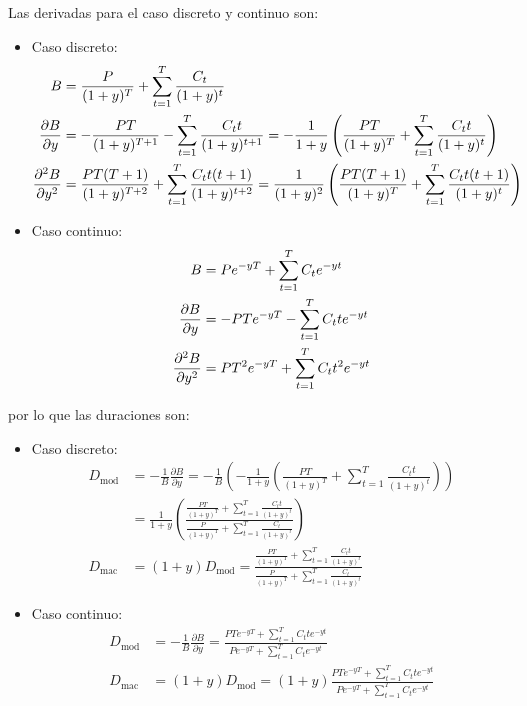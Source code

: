 Las derivadas para el caso discreto y continuo son:
\begin{itemize}
    \item Caso discreto:
    \begin{align}\label{eq:derivadas_bono_discreto}
        B &= \frac{P}{(1+y)^T} + \sum_{t=1}^{T} \frac{C_t}{(1+y)^t} \notag \\
        \frac{\partial B}{\partial y} &= -\frac{P T}{(1+y)^{T+1}} - \sum_{t=1}^{T} \frac{C_t t}{(1+y)^{t+1}} = - \frac{1}{1+y}\left( \frac{P T}{(1+y)^{T}} + \sum_{t=1}^{T} \frac{C_t t}{(1+y)^{t}} \right) \\
        \frac{\partial^2 B}{\partial y^2} &= \frac{P T (T+1)}{(1+y)^{T+2}} + \sum_{t=1}^{T} \frac{C_t t (t+1)}{(1+y)^{t+2}} = \frac{1}{(1+y)^2}\left( \frac{P T (T+1)}{(1+y)^{T}} + \sum_{t=1}^{T} \frac{C_t t (t+1)}{(1+y)^{t}} \right)  \notag
    \end{align}
    \item Caso continuo:
    \begin{align}\label{eq:derivadas_bono_continuo}
        B &= P e^{-yT} + \sum_{t=1}^{T} C_t e^{-yt}  \notag \\
        \frac{\partial B}{\partial y} &= -P T e^{-yT} - \sum_{t=1}^{T} C_t t e^{-yt} \\
        \frac{\partial^2 B}{\partial y^2} &= P T^2 e^{-yT} + \sum_{t=1}^{T} C_t t^2 e^{-yt}  \notag
    \end{align}
\end{itemize}
por lo que las duraciones son:
\begin{itemize}
    \item Caso discreto:
    \begin{align*}
        D_{\text{mod}} &=  -\frac{1}{B}\frac{\partial B}{\partial y} = -\frac{1}{B}\left(- \frac{1}{1+y}\left( \frac{P T}{(1+y)^{T}} + \sum_{t=1}^{T} \frac{C_t t}{(1+y)^{t}} \right)\right) \\
        &= \boxed{ \frac{1}{1+y}\left( \frac{ \frac{P T}{(1+y)^{T}} + \sum_{t=1}^{T} \frac{C_t t}{(1+y)^{t}} }{ \frac{P}{(1+y)^T} +\sum_{t=1}^{T} \frac{C_t}{(1+y)^t} } \right) } \\
        D_{\text{mac}} &= \boxed{ (1+y)D_{\text{mod}} = \frac{ \frac{P T}{(1+y)^{T}} + \sum_{t=1}^{T} \frac{C_t t}{(1+y)^{t}} }{ \frac{P}{(1+y)^T} +\sum_{t=1}^{T} \frac{C_t}{(1+y)^t} } }
    \end{align*}
    \item Caso continuo:
    \begin{align*}
        D_{\text{mod}} &=  -\frac{1}{B}\frac{\partial B}{\partial y} = \boxed{ \frac{ P T e^{-yT} + \sum_{t=1}^{T} C_t t e^{-yt} }{ P e^{-yT} + \sum_{t=1}^{T} C_t e^{-yt} } } \\
        D_{\text{mac}} &= (1+y)D_{\text{mod}} = \boxed{ (1+y)\frac{ P T e^{-yT} + \sum_{t=1}^{T} C_t t e^{-yt} }{ P e^{-yT} + \sum_{t=1}^{T} C_t e^{-yt} } }
    \end{align*}
\end{itemize}




